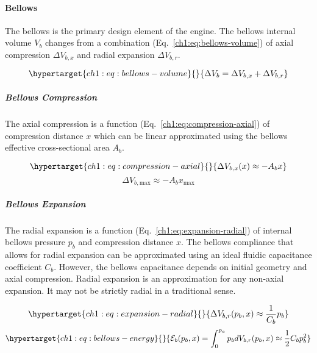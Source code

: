 \hypertarget{ch1:bellows}{%
\paragraph{Bellows}\label{ch1:bellows}}

The bellows is the primary design element of the engine. The bellows
internal volume \(V_b\) changes from a combination
(Eq.~\ref{ch1:eq:bellows-volume}) of axial compression \(\Delta V_{b,x}\)
and radial expansion \(\Delta V_{b,r}\).

\begin{equation}\protect\hypertarget{ch1:eq:bellows-volume}{}{ \Delta V_b = \Delta V_{b,x} + \Delta V_{b,r}   
}\label{ch1:eq:bellows-volume}\end{equation}

\hypertarget{ch1:bellows-compression}{%
\subparagraph{Bellows Compression}\label{ch1:bellows-compression}}

The axial compression is a function (Eq.~\ref{ch1:eq:compression-axial}) of
compression distance \(x\) which can be linear approximated using the
bellows effective cross-sectional area \(A_b\).

\begin{equation}\protect\hypertarget{ch1:eq:compression-axial}{}{ \Delta V_{b,x}(x) \approx -A_b x   
}\label{ch1:eq:compression-axial}\end{equation}
\[ \Delta V_{b,\text{max}} \approx -A_b x_\text{max}   
\]

\hypertarget{ch1:bellows-expansion}{%
\subparagraph{Bellows Expansion}\label{ch1:bellows-expansion}}

The radial expansion is a function (Eq.~\ref{ch1:eq:expansion-radial}) of
internal bellows pressure \(p_b\) and compression distance \(x\). The
bellows compliance that allows for radial expansion can be approximated
using an ideal fluidic capacitance coefficient \(C_b\). However, the
bellows capacitance depends on initial geometry and axial compression.
Radial expansion is an approximation for any non-axial expansion. It may
not be strictly radial in a traditional sense.

\begin{equation}\protect\hypertarget{ch1:eq:expansion-radial}{}{ \Delta V_{b,r}(p_b,x) \approx \frac{1}{C_b} p_b   
}\label{ch1:eq:expansion-radial}\end{equation}
\begin{equation}\protect\hypertarget{ch1:eq:bellows-energy}{}{ \mathcal{E}_b(p_b,x) = \int_{0}^{p_a} p_b dV_{b,r}(p_b,x)
\approx \frac{1}{2} C_b p_b^2 
}\label{ch1:eq:bellows-energy}\end{equation}

